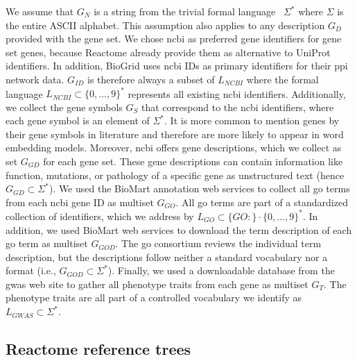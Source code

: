 \documentclass{thesisclass}
\begin{document}
We assume that $G_N$ is a string from the trivial formal language~\cite{Mendelson:2009:IML:1642730} $\Sigma^*$ where $\Sigma$ is the entire ASCII alphabet. 
This assumption also applies to any description $G_D$ provided with the  gene set.
We chose \acrshort{ncbi} as preferred gene identifiers for gene set genes, because Reactome already provide them as alternative to UniProt identifiers. 
In addition, BioGrid uses \acrshort{ncbi} IDs as primary identifiers for their \acrshort{ppi} network data.
$G_{ID}$ is therefore always a subset of $L_{NCBI}$ where the formal language $L_{NCBI} \subset \lbrace 0,\ldots,9 \rbrace^*$ represents all existing \acrshort{ncbi} identifiers. 
Additionally, we collect the gene symbols $G_S$ that correspond to the \acrshort{ncbi} identifiers, where each gene symbol is an element of $\Sigma^*$. 
It is more common to mention genes by their gene symbols in literature and therefore are more likely to appear in word embedding models. 
Moreover, \acrshort{ncbi} offers gene descriptions, which we collect as set $G_{GD}$ for each gene set. 
These gene descriptions can contain information like function, mutations, or pathology of a specific gene as unstructured text (hence $G_{GD} \subset \Sigma^*$).
We used the BioMart annotation web services to collect all \acrshort{go} terms from each \acrshort{ncbi} gene ID as multiset $G_{GO}$. 
All \acrshort{go} terms are part of a standardized collection of identifiers, which we address by $L_{GO} \subset \lbrace GO: \rbrace \cdot \lbrace 0, \ldots, 9 \rbrace^*$. 
In addition, we used BioMart web services to download the term description of each \acrshort{go} term as multiset $G_{GOD}$.
The \acrshort{go} consortium reviews the individual term description, but the descriptions follow neither a standard vocabulary nor a format (i.e., $G_{GOD} \subset \Sigma^*$).
Finally, we used a downloadable database from the \acrshort{gwas} web site to gather all phenotype traits from each gene as multiset $G_T$. 
The phenotype traits are all part of a controlled vocabulary we identify as $L_{GWAS} \subset \Sigma^*$.

\subsection{Reactome reference trees}

\end{document}
